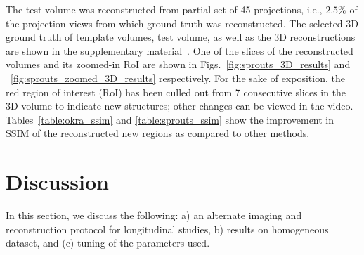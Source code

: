 \documentclass[journal]{IEEEtran}
\begin{document}
The test volume was reconstructed from partial set of 45
projections, i.e., $2.5\%$ of the projection views from which ground
truth was reconstructed. The selected 3D ground truth of
template volumes, test volume, as well as the 3D reconstructions are
shown in the supplementary material~\cite{supp_paper}. One of the slices of the reconstructed
volumes and its zoomed-in RoI are shown in
Figs.~\ref{fig:sprouts_3D_results} and
~\ref{fig:sprouts_zoomed_3D_results} respectively. For the sake of
exposition, the red region of interest (RoI) has been culled out from
7 consecutive slices in the 3D volume to indicate new structures;
other changes can be viewed in the video. Tables~\ref{table:okra_ssim}
and \ref{table:sprouts_ssim} show the improvement in SSIM of the reconstructed new regions as compared
to other methods.



\section{Discussion}
\label{sec:discussion}
In this section, we discuss the following:  a) an alternate imaging and reconstruction protocol for longitudinal studies, b) results on homogeneous dataset, and (c) tuning of the parameters used.
\end{document}
